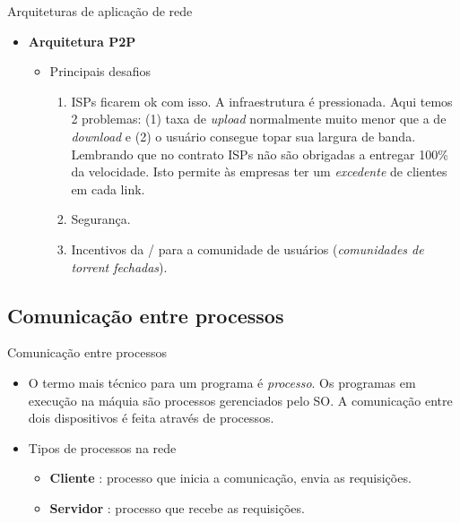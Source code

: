 \documentclass{libs/ufc_format}
\begin{document}
\begin{frame}{Arquiteturas de aplicação de rede}
    \begin{itemize}
        \item \textbf{Arquitetura P2P}
            \begin{itemize}
                \item Principais desafios
                    \begin{enumerate}
                        \justifying
                        \item<2-> ISPs ficarem ok com isso. A infraestrutura é pressionada. Aqui temos 2 problemas: (1) taxa de \textit{upload} normalmente muito menor que a de \textit{download} e (2) o usuário consegue topar sua largura de banda. Lembrando que no contrato ISPs não são obrigadas a entregar 100\% da velocidade. Isto permite às empresas ter um \textit{excedente} de clientes em cada link.
                        \item<3-> Segurança.
                        \item<4-> Incentivos da / para a comunidade de usuários (\textit{comunidades de torrent fechadas}).
                    \end{enumerate}
            \end{itemize}
    \end{itemize}
\end{frame}

\subsection{Comunicação entre processos}

\begin{frame}{Comunicação entre processos}
    \begin{itemize}
        \justifying
        \item O termo mais técnico para um programa é \textit{processo}. Os programas em execução na máquia são processos gerenciados pelo SO. A comunicação entre dois dispositivos é feita através de processos.
        \item Tipos de processos na rede
            \begin{itemize}
                \justifying
                \item<2> \textbf{Cliente} : processo que inicia a comunicação, envia as requisições.
                \item<2> \textbf{Servidor} : processo que recebe as requisições.
            \end{itemize}
    \end{itemize}
\end{frame}
\end{document}
